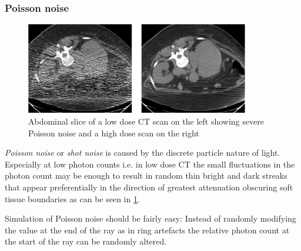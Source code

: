 \subsubsection{Poisson noise}
\begin{figure}[h]
	\centering
	\includegraphics[height=4cm]{images/poisson.png}
	\caption{Abdominal slice of a low dose CT scan on the left showing severe Poisson noise and a high dose scan on the right\cite{CausesAndReductionTechniques}}
	\label{poissonNoise}
\end{figure}
\par \emph{Poisson noise} or \emph{shot noise} is caused by the discrete particle nature of light. Especially at low photon counts i.e. in low dose CT the small fluctuations in the photon count may be enough to result in random thin bright and dark streaks that appear preferentially in the direction of greatest attenuation obscuring soft tissue boundaries as can be seen in \ref{poissonNoise}.\cite{CausesAndReductionTechniques}
\par Simulation of Poisson noise should be fairly easy: Instead of randomly modifying the value at the end of the ray as in ring artefacts the relative photon count at the start of the ray can be randomly altered.
